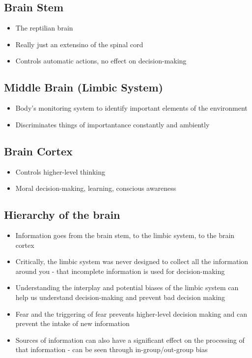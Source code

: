 \documentclass[11pt]{article}
\begin{document}
\subsection{Brain Stem}
\label{sec:orga032389}
\begin{itemize}
\item The reptilian brain
\item Really just an extensino of the spinal cord
\item Controls automatic actions, no effect on decision-making
\end{itemize}
\subsection{Middle Brain (Limbic System)}
\label{sec:org60349a6}
\begin{itemize}
\item Body's monitoring system to identify important elements of the environment
\item Discriminates things of importantance constantly and ambiently
\end{itemize}
\subsection{Brain Cortex}
\label{sec:org165695f}
\begin{itemize}
\item Controls higher-level thinking
\item Moral decision-making, learning, conscious awareness
\end{itemize}
\subsection{Hierarchy of the brain}
\label{sec:org16f4810}
\begin{itemize}
\item Information goes from the brain stem, to the limbic system, to the brain cortex
\item Critically, the limbic system was never designed to collect all the information around you - that incomplete information is used for decision-making
\item Understanding the interplay and potential biases of the limbic system can help us understand decision-making and prevent bad decision making
\item Fear and the triggering of fear prevents higher-level decision making and can prevent the intake of new information
\item Sources of information can also have a significant effect on the processing of that information - can be seen through in-group/out-group bias
\end{itemize}
\end{document}
